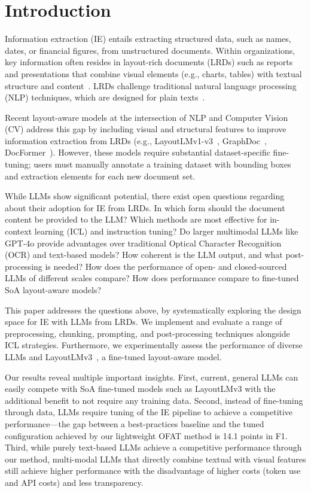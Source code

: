 \section{Introduction}

Information extraction (IE) entails extracting structured data, such as names, dates, or financial figures, from unstructured documents. 
Within organizations, key information often resides in layout-rich documents (LRDs) such as reports and presentations that combine visual elements (e.g., charts, tables) with textual structure and content~\cite{park2019cord, Wang_2023, zmigrod2024buddiebusinessdocumentdataset}. LRDs challenge traditional natural language processing (NLP) techniques, which are designed for plain texts~\cite{cui2021document, tang2023unifying}.



Recent layout-aware models at the intersection of NLP and Computer Vision (CV) address this gap by including visual and structural features to improve information extraction from LRDs (e.g., LayoutLMv1-v3~\cite{xu2020layoutlm, xu2020layoutlmv2, huang2022layoutlmv3}, GraphDoc~\cite{zhang2022multimodal}, DocFormer~\cite{appalaraju2021docformer}).
However, these models require substantial dataset-specific fine-tuning; users must manually annotate a training dataset with bounding boxes and extraction elements for each new document set.

While LLMs show significant potential, there exist open questions regarding about their adoption for IE from LRDs. In which form should the document content be provided to the LLM? Which methods are most effective for in-context learning (ICL) and instruction tuning? Do larger multimodal LLMs like GPT-4o provide advantages over traditional Optical Character Recognition (OCR) and text-based models? How coherent is the LLM output, and what post-processing is needed? How does the performance of open- and closed-sourced LLMs of different scales compare? How does performance compare to fine-tuned SoA layout-aware models?

This paper addresses the questions above, by systematically exploring the design space for IE with LLMs from LRDs. We implement and evaluate a range of preprocessing, chunking, prompting, and post-processing techniques alongside ICL strategies. Furthermore, we experimentally assess the performance of diverse LLMs and LayoutLMv3~\cite{huang2022layoutlmv3}, a fine-tuned layout-aware model.

Our results reveal multiple important insights. First, current, general LLMs can easily compete with SoA fine-tuned models such as LayoutLMv3 with the additional benefit to not require any training data. Second, instead of fine-tuning through data, LLMs require tuning of the IE pipeline to achieve a competitive performance---the gap between a best-practices baseline and the tuned configuration achieved by our lightweight OFAT method is 14.1 points in F1. Third, while purely text-based LLMs achieve a competitive performance through our method, multi-modal LLMs that directly combine textual with visual features still achieve higher performance with the disadvantage of higher costs (token use and API costs) and less transparency.

